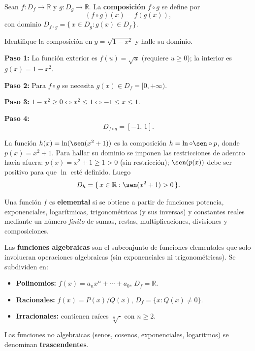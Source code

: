 \begin{definition}
Sean $f: D_f \to \mathbb{R}$ y $g: D_g \to \mathbb{R}$. La \textbf{composición} $f \circ g$ se define por
\[
  (f \circ g)(x) = f(g(x)),
\]
con dominio $D_{f \circ g} = \{\, x \in D_g : g(x) \in D_f \,\}$.
\end{definition}

\begin{example}
Identifique la composición en $y = \sqrt{1-x^2}$ y halle su dominio.

\begin{myproof}
\textbf{Paso 1:} La función exterior es $f(u) = \sqrt{u}$ (requiere $u \geq 0$); la interior es $g(x) = 1-x^2$.

\textbf{Paso 2:} Para $f\circ g$ se necesita $g(x) \in D_f = [0,+\infty)$.

\textbf{Paso 3:} $1-x^2 \geq 0 \Leftrightarrow x^2 \leq 1 \Leftrightarrow -1 \leq x \leq 1$.

\textbf{Paso 4:}
\[
  \boxed{D_{f\circ g} = [-1,\,1].}
\]
\end{myproof}
\end{example}

\begin{rem}
La función $h(x) = \ln(\sen(x^2+1))$ es la composición $h = \ln \circ \sen \circ p$, donde $p(x)=x^2+1$. Para hallar su dominio se imponen las restricciones de adentro hacia afuera: $p(x)=x^2+1 \geq 1 > 0$ (sin restricción); $\sen(p(x))$ debe ser positivo para que $\ln$ esté definido. Luego
\[
  D_h = \{\, x \in \mathbb{R} : \sen(x^2+1) > 0 \,\}.
\]
\end{rem}

\begin{definition}
Una función $f$ es \textbf{elemental} si se obtiene a partir de funciones potencia, exponenciales, logarítmicas, trigonométricas (y sus inversas) y constantes reales mediante un número \emph{finito} de sumas, restas, multiplicaciones, divisiones y composiciones.

Las \textbf{funciones algebraicas} son el subconjunto de funciones elementales que solo involucran operaciones algebraicas (sin exponenciales ni trigonométricas). Se subdividen en:
\begin{itemize}
  \item \textbf{Polinomios:} $f(x) = a_n x^n + \cdots + a_0$, $D_f = \mathbb{R}$.
  \item \textbf{Racionales:} $f(x) = P(x)/Q(x)$, $D_f = \{x : Q(x)\neq 0\}$.
  \item \textbf{Irracionales:} contienen raíces $\sqrt[n]{\cdot}$ con $n \geq 2$.
\end{itemize}
Las funciones no algebraicas (senos, cosenos, exponenciales, logaritmos) se denominan \textbf{trascendentes}.
\end{definition}



